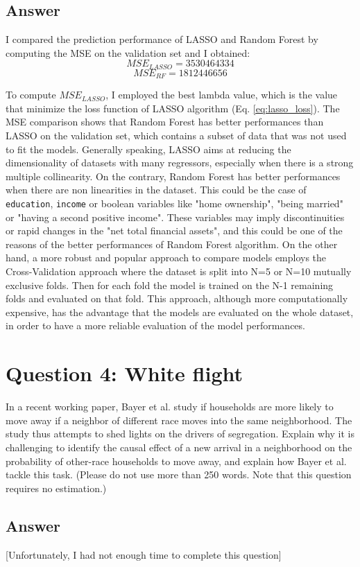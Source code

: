 \documentclass{article}
\begin{document}
	\subsection{Answer}
	I compared the prediction performance of LASSO and Random Forest by computing the MSE on the validation set and I obtained:
	$$MSE_{LASSO}=3530464334$$
	$$MSE_{RF}=1812446656$$
	
	To compute $MSE_{LASSO}$, I employed the best lambda value, which is the value that minimize the loss function of LASSO algorithm (Eq. \ref{eq:lasso_loss}).
	The MSE comparison shows that Random Forest has better performances than LASSO on the validation set, which contains a subset of data that was not used to fit the models.
	Generally speaking, LASSO aims at reducing the dimensionality of datasets with many regressors, especially when there is a strong multiple collinearity. On the contrary, Random Forest has better performances when there are non linearities in the dataset. This could be the case of \verb|education|, \verb|income| or boolean variables like "home ownership", "being married" or "having a second positive income". These variables may imply discontinuities or rapid changes in the "net total financial assets", and this could be one of the reasons of the better performances of Random Forest algorithm.
	On the other hand, a more robust and popular approach to compare models employs the Cross-Validation approach where the dataset is split into N=5 or N=10 mutually exclusive folds. Then for each fold the model is trained on the N-1 remaining folds and evaluated on that fold. This approach, although more computationally expensive, has the advantage that the models are evaluated on the whole dataset, in order to have a more reliable evaluation of the model performances.
	
	\section{Question 4: White flight}
	In a recent working paper, Bayer et al. study if households are more likely to move away if a neighbor of different race moves into the same neighborhood. The study thus attempts to shed lights on the drivers of segregation. Explain why it is challenging to identify the causal effect of a new arrival in a neighborhood on the probability of other-race households to move away, and explain how Bayer et al. tackle this task. (Please do not use more than
	250 words. Note that this question requires no estimation.)
	\subsection{Answer}
	[Unfortunately, I had not enough time to complete this question]
	
	\newpage
	
	
\end{document}

